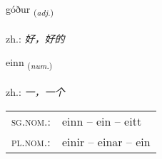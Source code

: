 \documentclass[frontgrid, backgrid]{flacards}\usepackage[]{graphicx}\usepackage[]{xcolor}
\begin{document}
\renewcommand{\flhead}{\vskip5pt \fboxsep=0pt {\small\bfseries\footnotesize Lýsingarorð | 形容词}}
\renewcommand{\fcfoot}{\vskip5pt \fboxsep=0pt \hspace{2pt}{\small\bfseries\footnotesize 1K}}

\renewcommand{\blhead}{\vskip5pt {\small\bfseries\footnotesize Lýsingarorð | 形容词 }}
\renewcommand{\bcfoot}{\vskip5pt \hspace{2pt}{\small\bfseries\footnotesize 1K}}


{góður \small{\textsubscript{(\textit{adj.})}} \\[1ex] %
\textphonetic{[kouːðʏr]} \\
zh.: \emph{好，好的} \\  [2ex]
\renewcommand*{\arraystretch}{0.8}
}

\renewcommand{\flhead}{\vskip5pt \fboxsep=0pt {\small\bfseries\footnotesize Töluorð | 数量词}}
\renewcommand{\fcfoot}{\vskip5pt \fboxsep=0pt \hspace{2pt}{\small\bfseries\footnotesize 1K}}

\renewcommand{\blhead}{\vskip5pt {\small\bfseries\footnotesize Töluorð | 数量词 }}
\renewcommand{\bcfoot}{\vskip5pt \hspace{2pt}{\small\bfseries\footnotesize 1K}}


{einn \small{\textsubscript{(\textit{num.})}} \\[1ex] %
\textphonetic{[eitn̥]} \\
zh.: \emph{一，一个} \\  [2ex]
\renewcommand*{\arraystretch}{0.8}
\begin{tabular}{ll}
\textsc{sg.nom.}: & einn  --  ein -- eitt \\ 
\textsc{pl.nom.}: & einir -- einar -- ein
\end{tabular}
}
\end{document}
